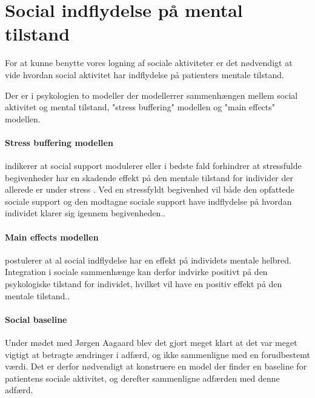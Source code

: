 \section{Social indflydelse på mental tilstand}

For at kunne benytte vores logning af sociale aktiviteter er det nødvendigt at 
vide hvordan social aktivitet har indflydelse på patienters mentale tilstand.

Der er i psykologien to modeller der modellerrer sammenhængen mellem social aktivitet og mental tilstand, "stress buffering" modellen og "main effects" modellen\cite{socialties}.

\paragraph{Stress buffering modellen} indikerer at social support modulerer eller i bedste fald forhindrer at stressfulde begivenheder har en skadende effekt på den mentale tilstand for individer der allerede er under stress \cite[p.~460]{socialties}.
Ved en stressfyldt begivenhed vil både den opfattede sociale support og den modtagne sociale support have indflydelse på hvordan individet klarer sig igennem begivenheden.\cite[p.~460]{socialties}.

\paragraph{Main effects modellen} postulerer at al social indflydelse har en effekt på individets mentale helbred.
Integration i sociale sammenhænge kan derfor indvirke positivt på den psykologiske tilstand for individet, hvilket vil have en positiv effekt på den mentale tilstand.\cite[p.~459]{socialties}.
 
\paragraph{Social baseline}
Under mødet med Jørgen Aagaard blev det gjort meget klart at det var meget vigtigt at betragte ændringer i adfærd, og ikke sammenligne med en forudbestemt værdi. 
Det er derfor nødvendigt at konstruere en model der finder en baseline for patientens sociale aktivitet, og derefter sammenligne adfærden med denne adfærd.
